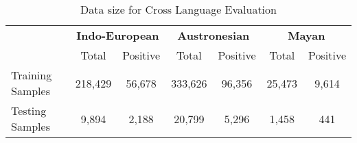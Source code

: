\begin{table*}[t]
\centering
\begin{tabular}{lcccccc}
\multicolumn{1}{c}{\textbf{}} & \multicolumn{2}{c}{\textbf{Indo-European}} & \multicolumn{2}{c}{\textbf{Austronesian}} & \multicolumn{2}{c}{\textbf{Mayan}} \\
\multicolumn{1}{c}{}          & Total               & Positive             & Total               & Positive            & Total           & Positive         \\
Training Samples              & 218,429             & 56,678               & 333,626             & 96,356              & 25,473          & 9,614            \\
Testing Samples               & 9,894               & 2,188                & 20,799              & 5,296               & 1,458           & 441             
\end{tabular}
\caption{Data size for Cross Language Evaluation}
\label{CL_count}
\end{table*}

